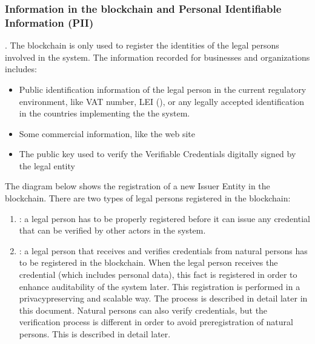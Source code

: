 \documentclass[a4paper,12pt,english]{sphinxhowto}
\begin{document}
\subsubsection{Information in the blockchain and Personal Identifiable Information (PII)}
\label{\detokenize{ssi/privacycred:information-in-the-blockchain-and-personal-identifiable-information-pii}}
\sphinxAtStartPar
{}. The blockchain is only used  to register the identities of the legal persons involved in the system. The information recorded for businesses and organizations includes:
\begin{itemize}
\item {} 
\sphinxAtStartPar
Public identification information of the legal person in the current regulatory environment, like VAT number, LEI (), or any legally accepted identification in the countries implementing the the system.

\item {} 
\sphinxAtStartPar
Some commercial information, like the web site

\item {} 
\sphinxAtStartPar
The public key used to verify the Verifiable Credentials digitally signed by the legal entity

\end{itemize}

\sphinxAtStartPar
The diagram below shows the registration of a new Issuer Entity in the blockchain. There are two types of legal persons registered in the blockchain:
\begin{enumerate}
%
\item {} 
\sphinxAtStartPar
{}: a legal person has to be properly registered before it can issue any credential that can be verified by other actors in the system.

\item {} 
\sphinxAtStartPar
{}: a legal person that receives and verifies credentials from natural persons has to be registered in the blockchain. When the legal person receives the credential (which includes personal data), this fact is registered in order to enhance auditability of the system later. This registration is performed in a privacy\sphinxhyphen{}preserving and scalable way. The process is described in detail later in this document. Natural persons can also verify credentials, but the verification process is different in order to avoid pre\sphinxhyphen{}registration of natural persons. This is described in detail later.

\end{enumerate}
\end{document}
